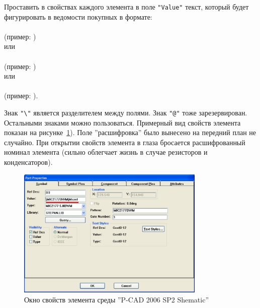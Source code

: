 \subsubsection{}Проставить в свойствах каждого элемента в поле \verb|"Value"| текст, который будет фигурировать в ведомости покупных в формате: \\
 \\ \hspace*{20mm} (пример: )\\
или \\
 \\ \hspace*{20mm} (пример: )\\
или \\
 \\ \hspace*{20mm} (пример: ).

Знак \verb|"\"| является разделителем между полями. Знак \verb|"@"| тоже
зарезервирован. Остальными знаками можно пользоваться. Примерный вид свойств элемента показан на рисунке~\ref{p:pic_pcad_component_properties}). Поле ''расшифровка'' было вынесено на передний план не случайно. При открытии свойств элемента в глаза бросается расшифрованный номинал элемента (сильно облегчает жизнь в случае резисторов и конденсаторов).

\begin{figure}[H]\center
  \includegraphics[width=0.8\textwidth]{VP_auto/pictures/pcad/pic_pcad_component_properties}
  \caption{Окно свойств элемента среды ''P-CAD 2006 SP2 Shematic''} \label{p:pic_pcad_component_properties}
\end{figure}

